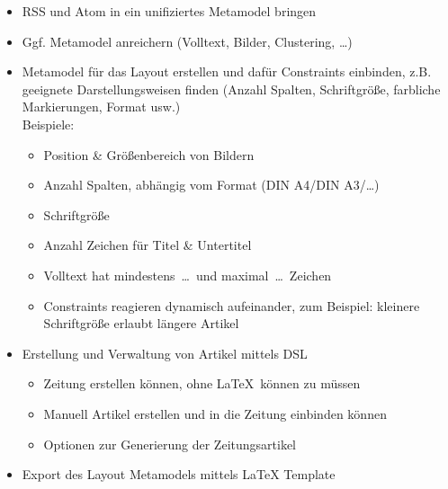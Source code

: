 \documentclass{article}
\begin{document}
\begin{multicols}{3}
{		
		\begin{itemize}
			\item RSS und Atom in ein unifiziertes Metamodel bringen
			\item Ggf. Metamodel anreichern (Volltext, Bilder, Clustering, …)
			\item Metamodel für das Layout erstellen und dafür Constraints  einbinden, z.B. geeignete Darstellungsweisen finden (Anzahl Spalten, Schriftgröße, farbliche Markierungen, Format usw.)\\
			Beispiele:
			\begin{itemize}
				\item Position \& Größenbereich von Bildern
				\item Anzahl Spalten, abhängig vom Format (DIN A4/DIN A3/\ldots)
				\item Schriftgröße
				\item Anzahl Zeichen für Titel \& Untertitel
				\item Volltext hat mindestens\ \ldots\ und maximal\ \ldots\ Zeichen
				\item Constraints reagieren dynamisch aufeinander, zum Beispiel: kleinere Schriftgröße erlaubt längere Artikel
			\end{itemize}
			\item Erstellung und Verwaltung von Artikel mittels DSL
			\begin{itemize}
				\item Zeitung erstellen können, ohne \LaTeX\ können zu müssen
				\item Manuell Artikel erstellen und in die Zeitung einbinden können
				\item Optionen zur Generierung der Zeitungsartikel 
			\end{itemize}
			\item Export des Layout Metamodels mittels LaTeX Template
		\end{itemize}
		
}
\end{multicols}
\end{document}
